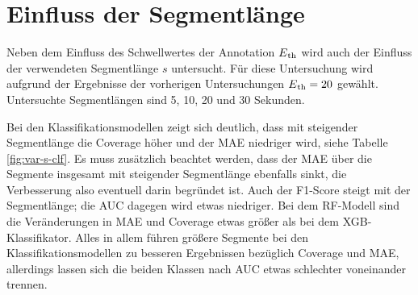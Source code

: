 \section{Einfluss der Segmentlänge}

Neben dem Einfluss des Schwellwertes der Annotation $E\textsubscript{th}$ wird auch der Einfluss der verwendeten Segmentlänge $s$ untersucht. Für diese Untersuchung wird aufgrund der Ergebnisse der vorherigen Untersuchungen $E\textsubscript{th}=20$ gewählt. Untersuchte Segmentlängen sind 5, 10, 20 und 30 Sekunden.

Bei den Klassifikationsmodellen zeigt sich deutlich, dass mit steigender Segmentlänge die Coverage höher und der \ac{MAE} niedriger wird, siehe Tabelle\,\ref{fig:var-s-clf}. Es muss zusätzlich beachtet werden, dass der \ac{MAE} über die Segmente insgesamt mit steigender Segmentlänge ebenfalls sinkt, die Verbesserung also eventuell darin begründet ist. Auch der F1-Score steigt mit der Segmentlänge; die \ac{AUC} dagegen wird etwas niedriger. Bei dem \ac{RF}-Modell sind die Veränderungen in \ac{MAE} und Coverage etwas größer als bei dem \ac{XGB}-Klassifikator. Alles in allem führen größere Segmente bei den Klassifikationsmodellen zu besseren Ergebnissen bezüglich Coverage und \ac{MAE}, allerdings lassen sich die beiden Klassen nach \ac{AUC} etwas schlechter voneinander trennen. 

